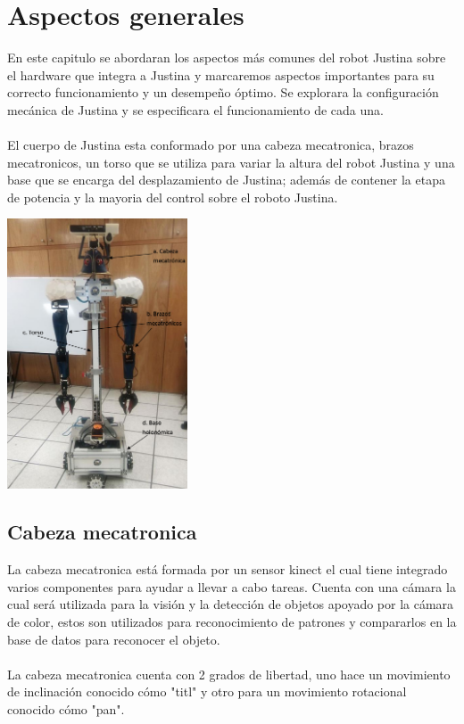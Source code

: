 \documentclass[user_manual.tex]{subfiles}
\begin{document}
 \chapter{Aspectos generales}
En este capitulo se abordaran los aspectos más comunes del robot Justina sobre el hardware que integra a Justina y marcaremos aspectos importantes para su correcto funcionamiento y un desempeño óptimo. Se explorara la configuración mecánica de Justina y se especificara el funcionamiento de cada una.\\
\\
El cuerpo de Justina esta conformado por una cabeza mecatronica, brazos mecatronicos, un torso que se utiliza para variar la altura del robot Justina y una base que se encarga del desplazamiento de Justina; además de contener la etapa de potencia y la mayoria del control sobre el roboto Justina.


\begin{center}
\includegraphics[width=0.4\textwidth]{Figures/Hardware/Diagramas/Cuerpo.png}
\label{fig:Hardware:Diagramas:Justina:Completa}
\end{center}
\section{Cabeza mecatronica}
 La cabeza mecatronica está formada por un sensor kinect el cual tiene integrado varios componentes para ayudar a
 llevar a cabo tareas. Cuenta con una cámara la cual será utilizada para la visión y la detección de objetos apoyado por la cámara de color, estos son utilizados para reconocimiento de patrones y compararlos en la 
 base de datos para reconocer el objeto.\\
 \\
 La cabeza mecatronica cuenta con 2 grados de libertad, uno hace un movimiento de inclinación conocido cómo "titl" y otro para un movimiento rotacional conocido cómo "pan".
\end{document}
